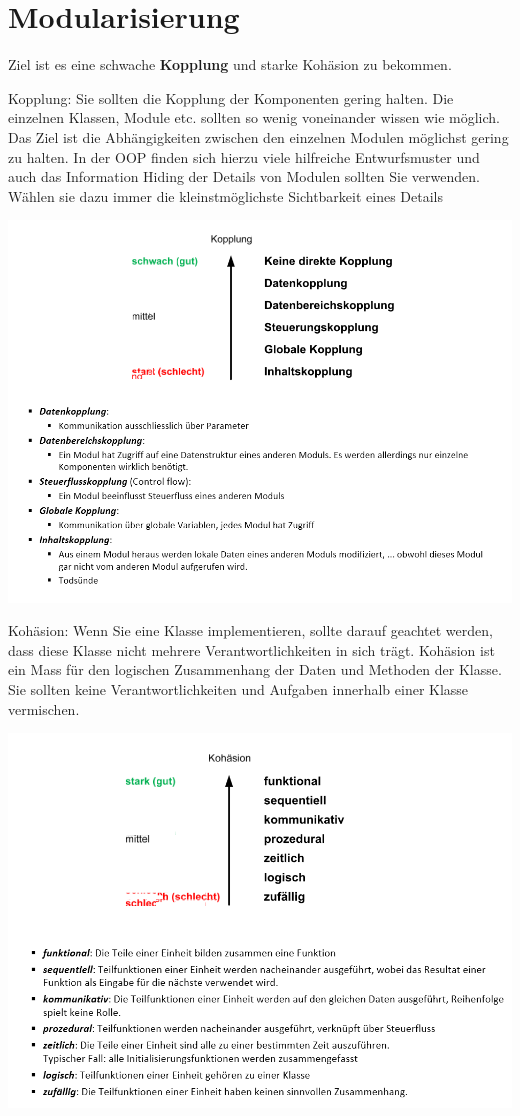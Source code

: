 \section{Modularisierung}
Ziel ist es eine schwache \textbf{Kopplung} und starke Kohäsion zu bekommen.

Kopplung: Sie sollten die Kopplung der Komponenten gering halten. Die einzelnen Klassen, Module etc. sollten so wenig voneinander wissen wie möglich. Das Ziel ist die Abhängigkeiten zwischen den einzelnen Modulen möglichst gering zu halten. In der OOP finden sich hierzu viele hilfreiche Entwurfsmuster und auch das Information Hiding der Details von Modulen sollten Sie verwenden. Wählen sie dazu immer die kleinstmöglichste Sichtbarkeit eines Details

\begin{center}
	\includegraphics[width=\columnwidth]{Images/kopplung}
\end{center}

Kohäsion: Wenn Sie eine Klasse implementieren, sollte darauf geachtet werden, dass diese Klasse nicht mehrere Verantwortlichkeiten in sich trägt. Kohäsion ist ein Mass für den logischen Zusammenhang der Daten und Methoden der Klasse. Sie sollten keine Verantwortlichkeiten und Aufgaben innerhalb einer Klasse vermischen.
\begin{center}
	\includegraphics[width=\columnwidth]{Images/kohäsion}
\end{center}

